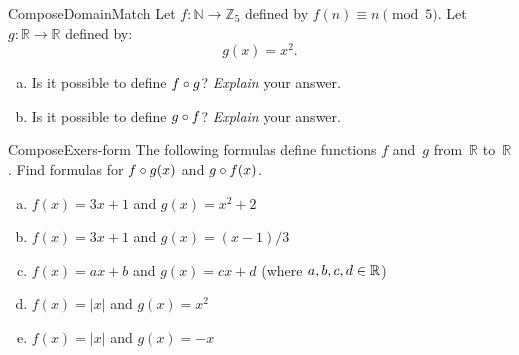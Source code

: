 \begin{exercise}{ComposeDomainMatch}
Let $f \colon \mathbb{N} \to \mathbb{Z}_5$ defined by 
$f(n) \equiv  n \pmod{5}$.
\noindent
Let $g \colon \mathbb{R} \to \mathbb{R}$ defined by:
$$g(x) = x^2.$$

\begin{enumerate}[(a)]
\item
Is it possible to define $f \circ g$? \emph{Explain} your answer.
\item
Is it possible to define $g \circ f$? \emph{Explain} your answer.
\end{enumerate}
\end{exercise}

\begin{exercise}{ComposeExers-form} 
 The following formulas define functions $f$ and~$g$ from~$\mathbb{R}$ to~$\mathbb{R}$. Find formulas for $f \circ g(x)$ and $g \circ f(x)$.
\begin{enumerate}[(a)]
\item \label{ComposeExers-form-(3x+1)(x2+2)}
 $f(x) = 3x + 1$ and $g(x) = x^2 + 2$ 
\item \label{ComposeExers-form-(3x+1)(x-1/3)}
 $f(x) = 3x + 1$ and $g(x) = (x-1)/3$ 
\item \label{ComposeExers-form-(ax+b)(cx+d)}
 $f(x) = ax + b$ and $g(x) = c x + d$ (where $a,b,c,d \in \mathbb{R}$)
\item \label{ComposeExers-form-(|x|)(x2)}
 $f(x) = |x|$ and $g(x) = x^2$ 
\item \label{ComposeExers-form-(|x|)(-x)}
 $f(x) = |x|$ and $g(x) = -x$ 
\end{enumerate}
\end{exercise}

